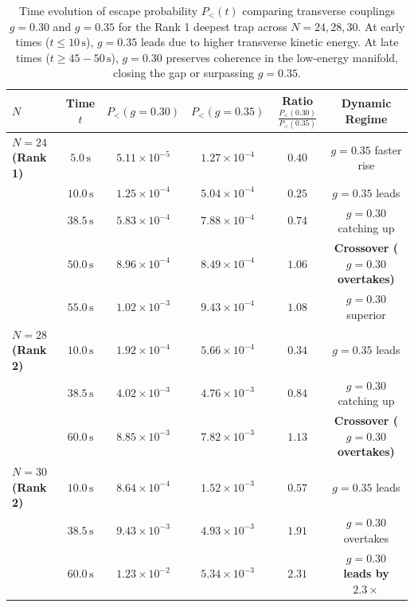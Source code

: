\begin{table}[h]
\centering
\small
\caption{Time evolution of escape probability $P_<(t)$ comparing transverse couplings $g = 0.30$ and $g = 0.35$ for the Rank 1 deepest trap across $N = 24, 28, 30$. At early times ($t \le 10\,\text{s}$), $g = 0.35$ leads due to higher transverse kinetic energy. At late times ($t \ge 45 - 50\,\text{s}$), $g = 0.30$ preserves coherence in the low-energy manifold, closing the gap or surpassing $g = 0.35$.}
\label{tab:coupling_crossover}
\begin{tabular}{lccccc}
\toprule
$N$ & Time $t$ & $P_<(g = 0.30)$ & $P_<(g = 0.35)$ & Ratio $\frac{P_<(0.30)}{P_<(0.35)}$ & Dynamic Regime \\
\midrule
\textbf{$N = 24$ (Rank 1)} & $5.0\,\text{s}$ & $5.11 \times 10^{-5}$ & $1.27 \times 10^{-4}$ & $0.40$ & $g = 0.35$ faster rise \\
& $10.0\,\text{s}$ & $1.25 \times 10^{-4}$ & $5.04 \times 10^{-4}$ & $0.25$ & $g = 0.35$ leads \\
& $38.5\,\text{s}$ & $5.83 \times 10^{-4}$ & $7.88 \times 10^{-4}$ & $0.74$ & $g = 0.30$ catching up \\
& $50.0\,\text{s}$ & $8.96 \times 10^{-4}$ & $8.49 \times 10^{-4}$ & $\mathbf{1.06}$ & \textbf{Crossover ($g = 0.30$ overtakes)} \\
& $55.0\,\text{s}$ & $1.02 \times 10^{-3}$ & $9.43 \times 10^{-4}$ & $\mathbf{1.08}$ & $g = 0.30$ superior \\
\midrule
\textbf{$N = 28$ (Rank 2)} & $10.0\,\text{s}$ & $1.92 \times 10^{-4}$ & $5.66 \times 10^{-4}$ & $0.34$ & $g = 0.35$ leads \\
& $38.5\,\text{s}$ & $4.02 \times 10^{-3}$ & $4.76 \times 10^{-3}$ & $0.84$ & $g = 0.30$ catching up \\
& $60.0\,\text{s}$ & $8.85 \times 10^{-3}$ & $7.82 \times 10^{-3}$ & $\mathbf{1.13}$ & \textbf{Crossover ($g = 0.30$ overtakes)} \\
\midrule
\textbf{$N = 30$ (Rank 2)} & $10.0\,\text{s}$ & $8.64 \times 10^{-4}$ & $1.52 \times 10^{-3}$ & $0.57$ & $g = 0.35$ leads \\
& $38.5\,\text{s}$ & $9.43 \times 10^{-3}$ & $4.93 \times 10^{-3}$ & $\mathbf{1.91}$ & $g = 0.30$ overtakes \\
& $60.0\,\text{s}$ & $1.23 \times 10^{-2}$ & $5.34 \times 10^{-3}$ & $\mathbf{2.31}$ & \textbf{$g = 0.30$ leads by $2.3\times$} \\
\bottomrule
\end{tabular}
\end{table}

